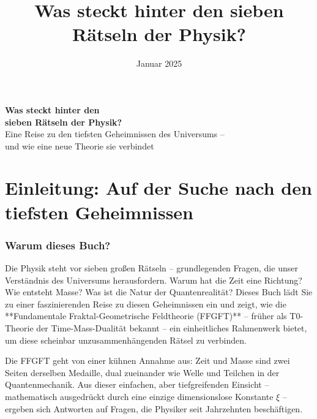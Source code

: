 \documentclass[11pt,openright,twoside]{book}
\title{Was steckt hinter den sieben Rätseln der Physik?}
\author{}
\date{Januar 2025}
\begin{document}
	\let\cleardoublepage\clearpage
	
	\setcounter{section}{0}
	\setcounter{subsection}{0}
	\setcounter{subsubsection}{0}
	\setcounter{paragraph}{0}
	
	\setcounter{secnumdepth}{1}  %
	\setcounter{tocdepth}{1}     %
\begin{center}
	\vspace*{2cm}
	{\Huge\textbf{Was steckt hinter den\\sieben Rätseln der Physik?}}\\[1.5cm]
	{\Large Eine Reise zu den tiefsten Geheimnissen des Universums –\\und wie eine neue Theorie sie verbindet}\\[2cm]
\end{center}
	
	\frontmatter
	\pagestyle{empty}
	
	\mainmatter
	\pagestyle{plain}
	
	\tableofcontents



\chapter*{Einleitung: Auf der Suche nach den tiefsten Geheimnissen}

\subsection*{Warum dieses Buch?}

Die Physik steht vor sieben großen Rätseln – grundlegenden Fragen, die unser Verständnis des Universums herausfordern. Warum hat die Zeit eine Richtung? Wie entsteht Masse? Was ist die Natur der Quantenrealität? Dieses Buch lädt Sie zu einer faszinierenden Reise zu diesen Geheimnissen ein und zeigt, wie die **Fundamentale Fraktal-Geometrische Feldtheorie (FFGFT)** – früher als T0-Theorie der Time-Mass-Dualität bekannt – ein einheitliches Rahmenwerk bietet, um diese scheinbar unzusammenhängenden Rätsel zu verbinden.

Die FFGFT geht von einer kühnen Annahme aus: Zeit und Masse sind zwei Seiten derselben Medaille, dual zueinander wie Welle und Teilchen in der Quantenmechanik. Aus dieser einfachen, aber tiefgreifenden Einsicht – mathematisch ausgedrückt durch eine einzige dimensionslose Konstante \(\xi\) – ergeben sich Antworten auf Fragen, die Physiker seit Jahrzehnten beschäftigen.
\end{document}
